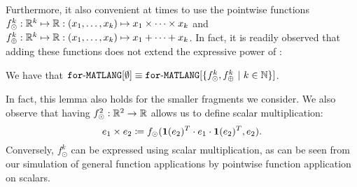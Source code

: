 Furthermore, it also convenient at times to use the pointwise functions
$f_\odot^k:\mathbb{R}^k\mapsto \mathbb{R}:(x_1,\ldots,x_k)\mapsto x_1\times \cdots \times x_k$ and 
$f_\oplus^k:\mathbb{R}^k\mapsto \mathbb{R}:(x_1,\ldots,x_k)\mapsto x_1+\cdots + x_k$. In fact, it is readily observed that adding these functions does not extend the expressive power of \langfor:
\begin{lemma}
\label{lm-prod-sum}
We have that $\texttt{for}\text{-}\texttt{MATLANG}[\emptyset] \equiv \texttt{for}\text{-}\texttt{MATLANG}[\{f_\odot^k,f_\oplus^k \ | \ k\in \mathbb{N}\}]$.
\end{lemma}
In fact, this lemma also holds for the smaller fragments we consider.
%
We also observe that having $f_\odot^2:\mathbb{R}^2\to\mathbb{R}$ allows us to define scalar multiplication:
$$
e_1\times e_2 \coloneqq f_{\odot}(\mathbf{1}(e_2)^T\cdot e_1 \cdot \mathbf{1}(e_2)^T, e_2).
$$
Conversely, $f_\odot^k$ can be expressed using scalar multiplication, as can be seen from our simulation of general function applications by pointwise function application on scalars.
